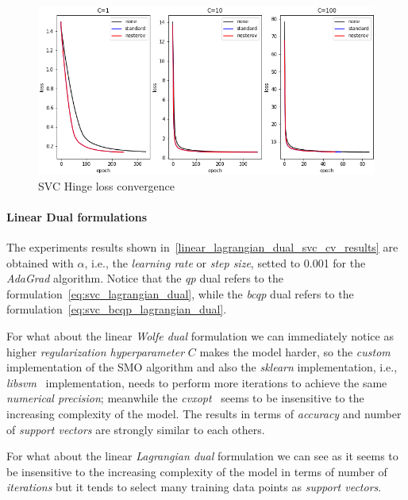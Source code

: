 \begin{figure}[H]
	\centering
	\includegraphics[scale=0.6]{img/svc_hinge_loss_history}
	\caption{SVC Hinge loss convergence}
	\label{fig:svc_hinge_loss_history}
\end{figure}

\paragraph{Linear Dual formulations}

The experiments results shown in~\ref{linear_lagrangian_dual_svc_cv_results} are obtained with $\alpha$, i.e., the \emph{learning rate} or \emph{step size}, setted to 0.001 for the \emph{AdaGrad} algorithm. Notice that the \emph{qp} dual refers to the formulation~\eqref{eq:svc_lagrangian_dual}, while the \emph{bcqp} dual refers to the formulation~\eqref{eq:svc_bcqp_lagrangian_dual}.



For what about the linear \emph{Wolfe dual} formulation we can immediately notice as higher \emph{regularization hyperparameter} $C$ makes the model harder, so the \emph{custom} implementation of the SMO algorithm and also the \emph{sklearn} implementation, i.e., \emph{libsvm}~\cite{chang2011libsvm} implementation, needs to perform more iterations to achieve the same \emph{numerical precision}; meanwhile the \emph{cvxopt}~\cite{vandenberghe2010cvxopt} seems to be insensitive to the increasing complexity of the model. The results in terms of \emph{accuracy} and number of \emph{support vectors} are strongly similar to each others.



For what about the linear \emph{Lagrangian dual} formulation we can see as it seems to be insensitive to the increasing complexity of the model in terms of number of \emph{iterations} but it tends to select many training data points as \emph{support vectors}.

